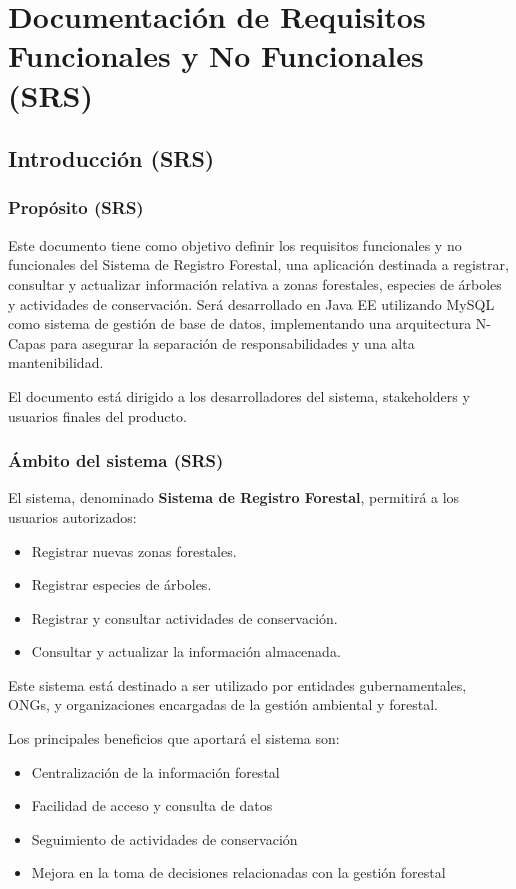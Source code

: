 \chapter{Documentación de Requisitos Funcionales y No Funcionales (SRS)}
\label{cap:srs}

\section{Introducción (SRS)}
\label{srs:introduccion}

\subsection{Propósito (SRS)}
\label{srs:proposito}
Este documento tiene como objetivo definir los requisitos funcionales y no funcionales del Sistema de Registro Forestal, una aplicación destinada a registrar, consultar y actualizar información relativa a zonas forestales, especies de árboles y actividades de conservación. Será desarrollado en Java EE utilizando MySQL como sistema de gestión de base de datos, implementando una arquitectura N-Capas para asegurar la separación de responsabilidades y una alta mantenibilidad.

El documento está dirigido a los desarrolladores del sistema, stakeholders y usuarios finales del producto.

\subsection{Ámbito del sistema (SRS)}
\label{srs:ambito}
El sistema, denominado \textbf{Sistema de Registro Forestal}, permitirá a los usuarios autorizados:
\begin{itemize}
\item Registrar nuevas zonas forestales.
\item Registrar especies de árboles.
\item Registrar y consultar actividades de conservación.
\item Consultar y actualizar la información almacenada.
\end{itemize}
Este sistema está destinado a ser utilizado por entidades gubernamentales, ONGs, y organizaciones encargadas de la gestión ambiental y forestal.

Los principales beneficios que aportará el sistema son:
\begin{itemize}
\item Centralización de la información forestal
\item Facilidad de acceso y consulta de datos
\item Seguimiento de actividades de conservación
\item Mejora en la toma de decisiones relacionadas con la gestión forestal
\end{itemize}


